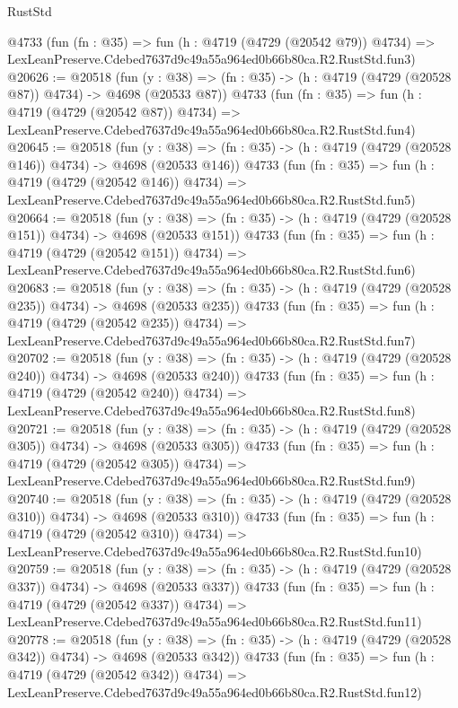 \begin{lexlean}{RustStd}
\begin{coremodule}
    @4733
    (fun (fn : @35) =>
    fun (h : @4719 (@4729 (@20542 @79)) @4734) =>
    LexLeanPreserve.Cdebed7637d9c49a55a964ed0b66b80ca.R2.RustStd.fun3)
@20626 := @20518
    (fun (y : @38) => (fn : @35) -> (h : @4719 (@4729 (@20528 @87)) @4734) -> @4698 (@20533 @87))
    @4733
    (fun (fn : @35) =>
    fun (h : @4719 (@4729 (@20542 @87)) @4734) =>
    LexLeanPreserve.Cdebed7637d9c49a55a964ed0b66b80ca.R2.RustStd.fun4)
@20645 := @20518
    (fun (y : @38) => (fn : @35) -> (h : @4719 (@4729 (@20528 @146)) @4734) -> @4698 (@20533 @146))
    @4733
    (fun (fn : @35) =>
    fun (h : @4719 (@4729 (@20542 @146)) @4734) =>
    LexLeanPreserve.Cdebed7637d9c49a55a964ed0b66b80ca.R2.RustStd.fun5)
@20664 := @20518
    (fun (y : @38) => (fn : @35) -> (h : @4719 (@4729 (@20528 @151)) @4734) -> @4698 (@20533 @151))
    @4733
    (fun (fn : @35) =>
    fun (h : @4719 (@4729 (@20542 @151)) @4734) =>
    LexLeanPreserve.Cdebed7637d9c49a55a964ed0b66b80ca.R2.RustStd.fun6)
@20683 := @20518
    (fun (y : @38) => (fn : @35) -> (h : @4719 (@4729 (@20528 @235)) @4734) -> @4698 (@20533 @235))
    @4733
    (fun (fn : @35) =>
    fun (h : @4719 (@4729 (@20542 @235)) @4734) =>
    LexLeanPreserve.Cdebed7637d9c49a55a964ed0b66b80ca.R2.RustStd.fun7)
@20702 := @20518
    (fun (y : @38) => (fn : @35) -> (h : @4719 (@4729 (@20528 @240)) @4734) -> @4698 (@20533 @240))
    @4733
    (fun (fn : @35) =>
    fun (h : @4719 (@4729 (@20542 @240)) @4734) =>
    LexLeanPreserve.Cdebed7637d9c49a55a964ed0b66b80ca.R2.RustStd.fun8)
@20721 := @20518
    (fun (y : @38) => (fn : @35) -> (h : @4719 (@4729 (@20528 @305)) @4734) -> @4698 (@20533 @305))
    @4733
    (fun (fn : @35) =>
    fun (h : @4719 (@4729 (@20542 @305)) @4734) =>
    LexLeanPreserve.Cdebed7637d9c49a55a964ed0b66b80ca.R2.RustStd.fun9)
@20740 := @20518
    (fun (y : @38) => (fn : @35) -> (h : @4719 (@4729 (@20528 @310)) @4734) -> @4698 (@20533 @310))
    @4733
    (fun (fn : @35) =>
    fun (h : @4719 (@4729 (@20542 @310)) @4734) =>
    LexLeanPreserve.Cdebed7637d9c49a55a964ed0b66b80ca.R2.RustStd.fun10)
@20759 := @20518
    (fun (y : @38) => (fn : @35) -> (h : @4719 (@4729 (@20528 @337)) @4734) -> @4698 (@20533 @337))
    @4733
    (fun (fn : @35) =>
    fun (h : @4719 (@4729 (@20542 @337)) @4734) =>
    LexLeanPreserve.Cdebed7637d9c49a55a964ed0b66b80ca.R2.RustStd.fun11)
@20778 := @20518
    (fun (y : @38) => (fn : @35) -> (h : @4719 (@4729 (@20528 @342)) @4734) -> @4698 (@20533 @342))
    @4733
    (fun (fn : @35) =>
    fun (h : @4719 (@4729 (@20542 @342)) @4734) =>
    LexLeanPreserve.Cdebed7637d9c49a55a964ed0b66b80ca.R2.RustStd.fun12)

\end{coremodule}
\end{lexlean}
